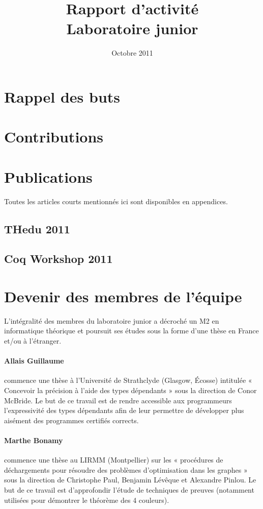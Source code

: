 \documentclass[11pt]{article}
\title{Rapport d'activité\\
Laboratoire junior \coqtail{}}
\date{Octobre 2011}
\begin{document}
\maketitle

\section{Rappel des buts}

\section{Contributions}

\section{Publications}

Toutes les articles courts mentionnés ici sont disponibles
en appendices.

\subsection{THedu 2011}

\subsection{Coq Workshop 2011}

\section{Devenir des membres de l'équipe}

L'intégralité des membres du laboratoire junior a décroché un M2
en informatique théorique et poursuit ses études sous la forme
d'une thèse en France et/ou à l'étranger.

\paragraph{Allais Guillaume} commence une thèse à l'Université de
Strathclyde (Glasgow, Écosse) intitulée « Concevoir la précision
à l'aide des types dépendants » sous la direction de Conor McBride.
Le but de ce travail est de rendre accessible aux programmeurs
l'expressivité des types dépendants afin de leur permettre de
développer plus aisément des programmes certifiés corrects.

\paragraph{Marthe Bonamy} commence une thèse au LIRMM (Montpellier)
sur les « procédures de déchargements pour résoudre des problèmes
d'optimisation dans les graphes » sous la direction de Christophe
Paul, Benjamin Lévêque et Alexandre Pinlou.
Le but de ce travail est d'approfondir l'étude de techniques de
preuves (notamment utilisées pour démontrer le théorème des 4 couleurs).
\end{document}

